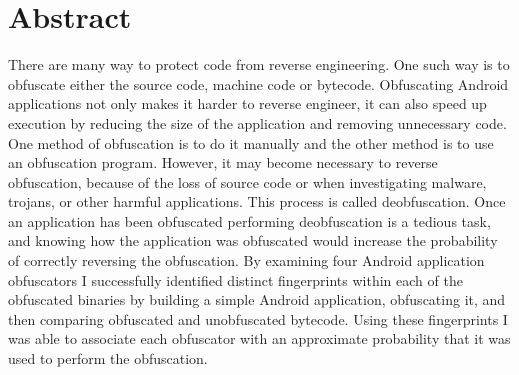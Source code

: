 \section*{Abstract}
There are many way to protect code from reverse engineering. One such way is to obfuscate either the source code, machine code or bytecode. Obfuscating Android applications not only makes it harder to reverse engineer, it can also speed up execution by reducing the size of the application and removing unnecessary code. One method of obfuscation is to do it manually and the other method is to use an obfuscation program. However, it may become necessary to reverse obfuscation, because of the loss of source code or when investigating malware, trojans, or other harmful applications. This process is called deobfuscation. Once an application has been obfuscated performing deobfuscation is a tedious task, and knowing how the application was obfuscated would increase the probability of correctly reversing the obfuscation. By examining four Android application obfuscators I successfully identified distinct fingerprints within each of the obfuscated binaries by building a simple Android application, obfuscating it, and then comparing obfuscated and unobfuscated bytecode. Using these fingerprints I was able to associate each obfuscator with an approximate probability that it was used to perform the obfuscation.